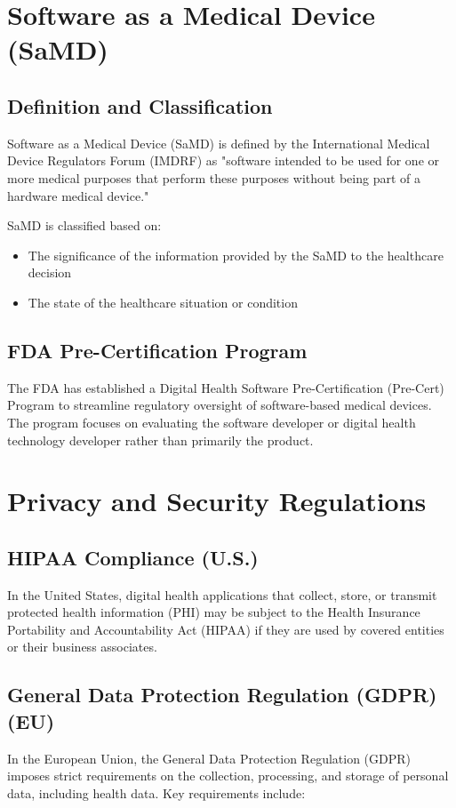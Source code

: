 \section{Software as a Medical Device (SaMD)}
\subsection{Definition and Classification}
Software as a Medical Device (SaMD) is defined by the International Medical Device Regulators Forum (IMDRF) as "software intended to be used for one or more medical purposes that perform these purposes without being part of a hardware medical device."

SaMD is classified based on:
\begin{itemize}
    \item The significance of the information provided by the SaMD to the healthcare decision
    \item The state of the healthcare situation or condition
\end{itemize}

\subsection{FDA Pre-Certification Program}
The FDA has established a Digital Health Software Pre-Certification (Pre-Cert) Program to streamline regulatory oversight of software-based medical devices. The program focuses on evaluating the software developer or digital health technology developer rather than primarily the product.

\section{Privacy and Security Regulations}
\subsection{HIPAA Compliance (U.S.)}
In the United States, digital health applications that collect, store, or transmit protected health information (PHI) may be subject to the Health Insurance Portability and Accountability Act (HIPAA) if they are used by covered entities or their business associates.

\subsection{General Data Protection Regulation (GDPR) (EU)}
In the European Union, the General Data Protection Regulation (GDPR) imposes strict requirements on the collection, processing, and storage of personal data, including health data. Key requirements include:

